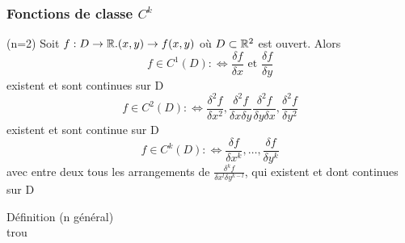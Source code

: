 \documentclass[12pt,a4paper]{article}
\begin{document}
\subsubsection{Fonctions de classe $C^k$}
\begin{boite}
	(n=2) Soit $f:D\to \mathbb{R}. (x,y) \to f(x,y)$ où $D\subset \mathbb{R}^2$ est ouvert. Alors 
	\begin{equation*}
		f \in C^1 (D) : \iff \frac{\delta f}{\delta x}\text{ et }\frac{\delta f}{\delta y}
	\end{equation*}
	existent et sont continues sur D
		\begin{equation*}
		f \in C^2 (D) : \iff \frac{\delta^2 f}{\delta x^2}, \frac{\delta^2 f}{\delta x\delta y} \frac{\delta^2 f}{\delta y\delta x}, \frac{\delta^2 f}{\delta y^2}
	\end{equation*}
	existent et sont continue sur D
	\begin{equation*}
		f \in C^k (D) : \iff \frac{\delta f}{\delta x^k},\ldots,\frac{\delta f}{\delta y^k}
	\end{equation*}
	avec entre deux tous les arrangements de $\frac{\delta^k f}{\delta x^l \delta y^{k-l}}$, qui existent et dont continues sur D
\end{boite}
\begin{boite}
Définition (n général)\\
{trou}\\
\end{boite}
\end{document}
